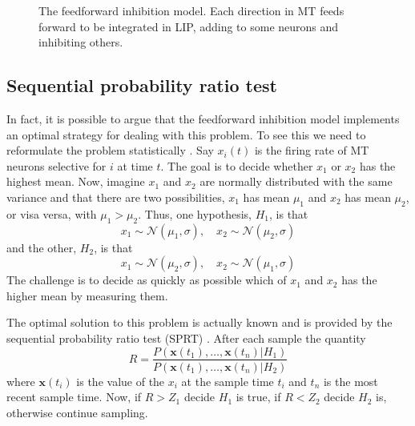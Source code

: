\documentclass[11pt,a4paper]{scrartcl}
\begin{document}
\begin{figure}
\begin{center}
\end{center}
\caption{The feedforward inhibition model. Each direction in MT feeds forward to be
  integrated in LIP, adding to some neurons and inhibiting others.\label{fig:ffh}}
\end{figure}

\subsection*{Sequential probability ratio test}

In fact, it is possible to argue that the feedforward inhibition model
implements an optimal strategy for dealing with this problem. To see
this we need to reformulate the problem statistically
\cite{GoldShadlen2001a}. Say $x_i(t)$ is the firing rate of MT neurons
selective for $i$ at time $t$. The goal is to decide whether $x_1$ or
$x_2$ has the highest mean. Now, imagine $x_1$ and $x_2$ are normally
distributed with the same variance and that there are two
possibilities, $x_1$ has mean $\mu_1$ and $x_2$ has mean $\mu_2$, or
visa versa, with $\mu_1>\mu_2$. Thus, one hypothesis, $H_1$, is that
\begin{equation}
x_1\sim \mathcal{N}(\mu_1,\sigma),\quad x_2\sim \mathcal{N}(\mu_2,\sigma)
\end{equation}
and the other, $H_2$, is that
\begin{equation}
x_1\sim \mathcal{N}(\mu_2,\sigma),\quad x_2\sim \mathcal{N}(\mu_1,\sigma)
\end{equation}
The challenge is to decide as quickly as possible which of $x_1$ and
$x_2$ has the higher mean by measuring them.

The optimal solution to this problem is actually known and is provided
by the sequential probability ratio test (SPRT) \cite{Wald1947a}. After each sample the quantity
\begin{equation}
R=\frac{P(\textbf{x}(t_1),\ldots,\textbf{x}(t_n)|H_1)}{P(\textbf{x}(t_1),\ldots,\textbf{x}(t_n)|H_2)}
\end{equation}
where $\textbf{x}(t_i)$ is the value of the $x_i$ at the sample time
$t_i$ and $t_n$ is the most recent sample time. Now, if $R>Z_1$ decide
$H_1$ is true, if $R<Z_2$ decide $H_2$ is, otherwise continue
sampling.
\end{document}
